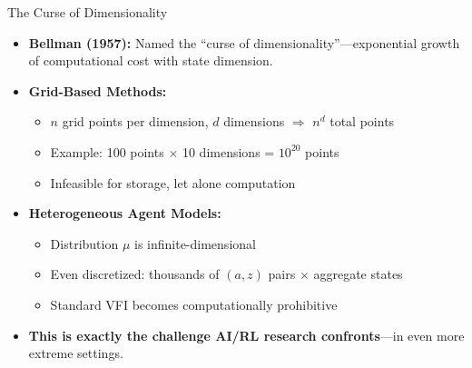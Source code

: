 \begin{frame}{The Curse of Dimensionality}
\begin{itemize}
\item \textbf{Bellman (1957):} Named the ``curse of dimensionality''---exponential growth of computational cost with state dimension.

\medskip
\item \textbf{Grid-Based Methods:}
\begin{itemize}
    \item $n$ grid points per dimension, $d$ dimensions $\Rightarrow$ $n^d$ total points
    \item Example: 100 points $\times$ 10 dimensions = $10^{20}$ points
    \item Infeasible for storage, let alone computation
\end{itemize}

\medskip
\item \textbf{Heterogeneous Agent Models:}
\begin{itemize}
    \item Distribution $\mu$ is infinite-dimensional
    \item Even discretized: thousands of $(a, z)$ pairs $\times$ aggregate states
    \item Standard VFI becomes computationally prohibitive
\end{itemize}

\medskip
\item \textbf{This is exactly the challenge AI/RL research confronts}---in even more extreme settings.
\end{itemize}
\end{frame}

